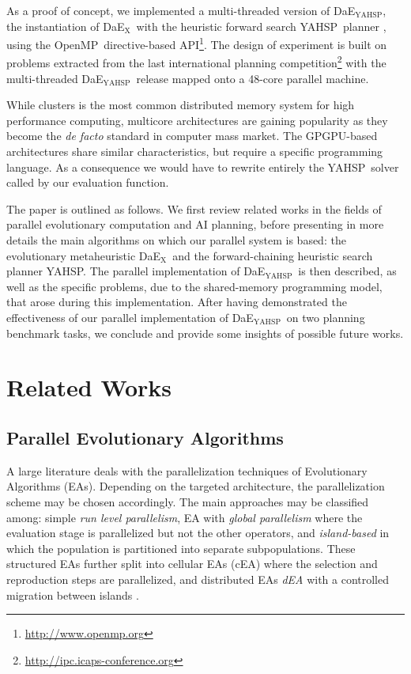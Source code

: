 \documentclass{sig-alternate}
\newcommand{\DAEX}{{\sc DaE$_{\text{X}}$}}
\newcommand{\DAEYAHSP}{{\sc DaE$_{\text{YAHSP}}$}}
\newcommand{\YAHSP}{{\sc YAHSP}}
\newcommand{\OPENMP}{{\sc OpenMP}}
\begin{document}
As a proof of concept, we implemented a multi-threaded version of \DAEYAHSP, the
instantiation of \DAEX\ with the heuristic forward search \YAHSP\ planner
\cite{yahsp:icaps2004}, using the \OPENMP\ directive-based
API\footnote{\url{http://www.openmp.org}}. The design of experiment is built on
problems extracted from the last international planning
competition\footnote{\url{http://ipc.icaps-conference.org}} with the
multi-threaded \DAEYAHSP\ release mapped onto a 48-core parallel machine.

While clusters is the most common distributed memory system for high performance
computing, multicore architectures are gaining popularity as they become the
{\it de facto} standard in computer mass market. The GPGPU-based architectures
share similar characteristics, but require a specific programming language.
As a consequence we would have to rewrite entirely the \YAHSP\ solver called by our evaluation function.

The paper is outlined as follows. We first review related works in the
fields of parallel evolutionary computation and AI planning, before presenting
in more details the main algorithms on which our parallel system is based: the
evolutionary metaheuristic \DAEX\ and the forward-chaining heuristic search
planner YAHSP. The parallel implementation of \DAEYAHSP\ is then described, as
well as the specific problems, due to the shared-memory programming model, that
arose during this implementation. After having demonstrated the effectiveness
of our parallel implementation of \DAEYAHSP\ on two planning benchmark tasks, we
conclude and provide some insights of possible future works.

\section{Related Works}

\subsection{Parallel Evolutionary Algorithms}

A large literature deals with the parallelization techniques of Evolutionary
Algorithms (EAs). Depending on the targeted architecture, the parallelization
scheme may be chosen accordingly. The main approaches may be classified among:
simple {\it run level parallelism}, EA with {\it global parallelism} where the
evaluation stage is parallelized but not the other operators, and
{\it island-based} in which the population is partitioned into
separate subpopulations. These structured EAs further split into cellular
EAs (cEA) where the selection and reproduction steps are parallelized, and
distributed EAs {\it dEA} with a controlled migration between islands
\cite{alba:IEEE2002}.
\end{document}
